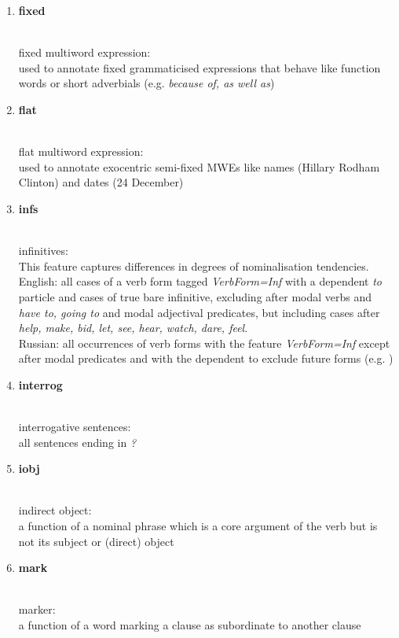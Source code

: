 \begin{enumerate}
	\item \hypertarget{ft:fixed}{\textbf{fixed}} \\
		fixed multiword expression: \\
		used to annotate fixed grammaticised expressions that behave like function words or short adverbials (e.g. \textit{because of, as well as})
	
	\item \hypertarget{ft:flat}{\textbf{flat}} \\
		flat multiword expression: \\
		used to annotate exocentric semi-fixed MWEs like names (Hillary Rodham Clinton) and dates (24 December)
		
	\item \hypertarget{ft:infs}{\textbf{infs}} \\
		infinitives: \\
		This feature captures differences in degrees of nominalisation tendencies. \\
		English: all cases of a verb form tagged \textit{VerbForm=Inf} with a dependent \textit{to} particle and cases of true bare infinitive, excluding after modal verbs and \textit{have to, going to} and modal adjectival predicates, but including cases after \textit{help, make, bid, let, see, hear, watch, dare, feel}. \\
		Russian: all occurrences of verb forms with the feature \textit{VerbForm=Inf} except after modal predicates and with the dependent  to exclude future forms (e.g. )
	
	\item \hypertarget{ft:interrog}{\textbf{interrog}} \\
		interrogative sentences: \\
		all sentences ending in \textit{?}
	
	\item \hypertarget{ft:iobj}{\textbf{iobj}} \\
		indirect object: \\
		a function of a nominal phrase which is a core argument of the verb but is not its subject or (direct) object
	
	\item \hypertarget{ft:mark}{\textbf{mark}} \\
		marker: \\
		a function of a word marking a clause as subordinate to another clause
	

\end{enumerate}
